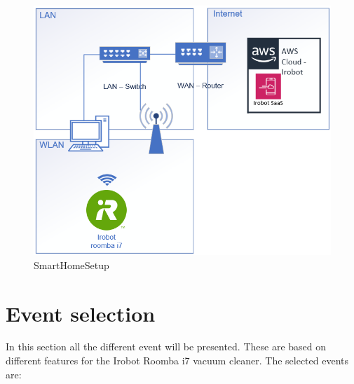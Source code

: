 \begin{figure}[H]
    \centering
    \includegraphics[width=\textwidth]{figures/SmartHomeSetup.png}
    \caption{SmartHomeSetup}
    \label{fig:SmartHomeSetup}
\end{figure}


\section{Event selection}
In this section all the different event will be presented. These are based on different features for the Irobot Roomba i7 vacuum cleaner. The selected events are: 

